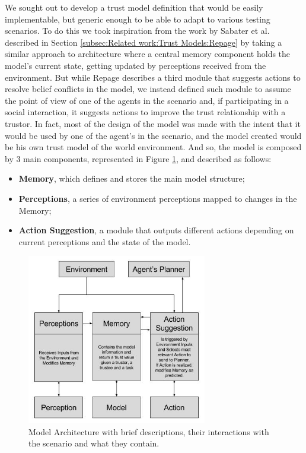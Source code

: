 \label{chap:TrustModel}

We sought out to develop a trust model definition that would be easily implementable, but generic enough to be able to adapt to various testing scenarios. To do this we took inspiration from the work by Sabater et al.\cite{Sabater2006} described in Section \ref{subsec:Related work:Trust Models:Repage} by taking a similar approach to architecture where a central memory component holds the model's current state, getting updated by perceptions received from the environment. But while Repage describes a third module that suggests actions to resolve belief conflicts in the model, we instead defined such module to assume the point of view of one of the agents in the scenario and, if participating in a social interaction, it suggests actions to improve the trust relationship with a trustor. In fact, most of the design of the model was made with the intent that it would be used by one of the agent's in the scenario, and the model created would be his own trust model of the world environment. And so, the model is composed by 3 main components, represented in Figure \ref{fig:ModelArchitecture}, and described as follows:
\begin{itemize}
    \item \textbf{Memory}, which defines and stores the main model structure;
    \item \textbf{Perceptions}, a series of environment perceptions mapped to changes in the Memory;
    \item \textbf{Action Suggestion}, a module that outputs different actions depending on current perceptions and the state of the model.
\end{itemize}

\begin{figure}[hbt]
    \centering
    \includegraphics[width=0.7\textwidth]{figures/ModelDiagram.jpg}
    \caption{Model Architecture with brief descriptions, their interactions with the scenario and what they contain.}
    \label{fig:ModelArchitecture}
\end{figure}


